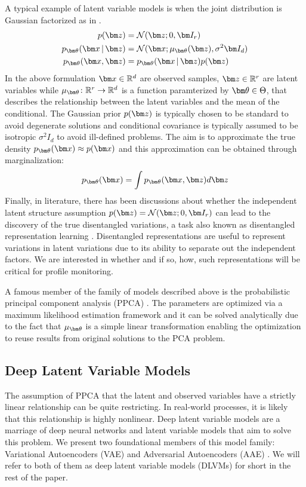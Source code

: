 \documentclass{scrartcl}
\theoremstyle{definition}
\let\ref\Cref
\begin{document}
A typical example of latent variable models is when the joint distribution is Gaussian factorized as in \ref{eq:gaussian-factorized}.
\begin{equation}
\label{eq:gaussian-factorized}
\begin{split}
\pz &= \Norm(\mbz;0,\mbI_{r})\\
\decoding &= \Norm(\mbx; \mu_{\mbtheta}(\mbz),\sigma^2 \mbI_{d}) \\
p_{\mbtheta}(\mbx,\mbz) &= \decoding\pz
\end{split}
\end{equation}
In the above formulation $\mbx \in \R^{d}$ are observed samples, $\mbz \in \R^{r}$ are latent variables while $\mu_{\mbtheta}\colon\R^{r}\to\R^{d} $ is a function paramterized by $\mbtheta \in \Theta$, that describes the relationship between the latent variables and the mean of the conditional. The Gaussian prior $\pz$ is typically chosen to be standard to avoid degenerate solutions \parencite[p. 307]{roweis1999unifying} and conditional covariance is typically assumed to be isotropic $\sigma^2 I_{d}$ to avoid ill-defined problems.
The aim is to approximate the true density $p_{\mbtheta}(\mbx) \approx p(\mbx)$ and this approximation can be obtained through marginalization:
$$
p_{\mbtheta}(\mbx) = \int p_{\mbtheta}(\mbx,\mbz) d\mbz
$$
Finally, in literature, there has been discussions about  whether the independent latent structure assumption $\pz = \Norm(\mbz;0,\mbI_{r})$ can lead to the discovery of the true disentangled variations, a task also known as disentangled representation learning \parencite[Sec. 3.5]{bengio2013representation}. Disentangled representations are useful to represent variations in latent variations due to its ability to separate out the independent factors. We are interested in whether and if so, how, such representations will be critical for profile monitoring. 

A famous member of the family of models described above is the probabilistic principal component analysis (PPCA) \parencite{tipping1999probabilistic}.
The parameters are optimized via a maximum likelihood estimation framework and it can be solved analytically due to the fact that $\mu_{\mbtheta}$ is a simple linear transformation enabling the optimization to reuse results from original solutions to the PCA problem.

\subsection{Deep Latent Variable Models}
The assumption of PPCA that the latent and observed variables have a strictly linear relationship can be quite restricting.
In real-world processes, it is likely that this relationship is highly nonlinear.
Deep latent variable models are a marriage of deep neural networks and latent variable models that aim to solve this problem.
We present two foundational members of this model family: Variational Autoencoders (VAE) \parencite{Kingma2013-dl} and Adversarial Autoencoders (AAE) \parencite{Makhzani2015-ei}.
We will refer to both of them as deep latent variable models (DLVMs) for short in the rest of the paper.
\end{document}
